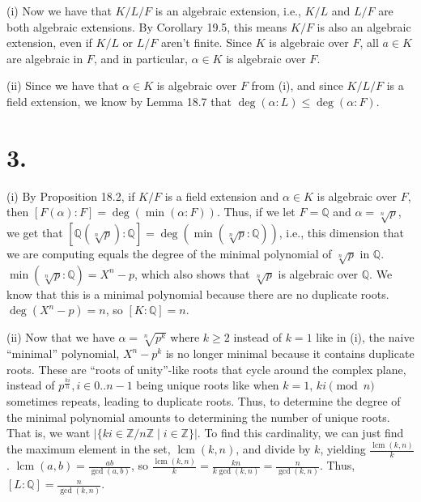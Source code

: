 \documentclass[fleqn]{article}
\DeclareMathOperator{\lcm}{lcm}
\begin{document}
    (i) Now we have that $K/L/F$ is an algebraic extension, i.e., $K/L$ and $L/F$ are both algebraic extensions.  By Corollary 19.5, this means $K/F$ is also an algebraic extension, even if $K/L$ or $L/F$ aren't finite.  Since $K$ is algebraic over $F$, all $a \in K$ are algebraic in $F$, and in particular, $\alpha \in K$ is algebraic over $F$.
    
    (ii) Since we have that $\alpha \in K$ is algebraic over $F$ from (i), and since $K/L/F$ is a field extension, we know by Lemma 18.7 that $\deg(\alpha : L) \leq \deg(\alpha : F)$.
    
    \pagebreak
    
    \section{3.}
    
    (i) By Proposition 18.2, if $K/F$ is a field extension and $\alpha \in K$ is algebraic over $F$, then $[F(\alpha) : F] = \deg(\min(\alpha : F))$.  Thus, if we let $F = \mathbb{Q}$ and $\alpha = \sqrt[n]{p}$, we get that $[\mathbb{Q}(\sqrt[n]{p}) : \mathbb{Q}] = \deg(\min(\sqrt[n]{p} : \mathbb{Q}))$, i.e., this dimension that we are computing equals the degree of the minimal polynomial of $\sqrt[n]{p}$ in $\mathbb{Q}$.  $\min(\sqrt[n]{p} : \mathbb{Q}) = X^n - p$, which also shows that $\sqrt[n]{p}$ is algebraic over $\mathbb{Q}$.  We know that this is a minimal polynomial because there are no duplicate roots.  $\deg(X^n - p) = n$, so $[K : \mathbb{Q}] = n$.
    
    (ii) Now that we have $\alpha = \sqrt[n]{p^k}$ where $k \geq 2$ instead of $k = 1$ like in (i), the naive ``minimal'' polynomial, $X^n - p^k$ is no longer minimal because it contains duplicate roots.  These are ``roots of unity''-like roots that cycle around the complex plane, instead of $p^{\frac{ki}{n}}, i \in 0..n - 1$ being unique roots like when $k = 1$, $ki \pmod{n}$ sometimes repeats, leading to duplicate roots.  Thus, to determine the degree of the minimal polynomial amounts to determining the number of unique roots.  That is, we want $|\{ki \in \mathbb{Z}/n\mathbb{Z} \mid i \in \mathbb{Z}\}|$.  To find this cardinality, we can just find the maximum element in the set, $\lcm(k, n)$, and divide by $k$, yielding $\frac{\lcm(k, n)}{k}$.  $\lcm(a, b) = \frac{ab}{\gcd(a, b)}$, so $\frac{\lcm(k, n)}{k} = \frac{kn}{k \gcd(k, n)} = \frac{n}{\gcd(k, n)}$.  Thus, $[L : \mathbb{Q}] = \frac{n}{\gcd(k, n)}$.
    
    \pagebreak
    
\end{document}
